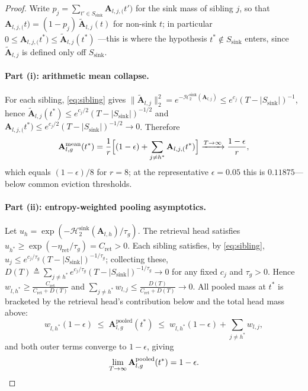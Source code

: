 \documentclass[final,5p,times,twocolumn]{elsarticle}
\theoremstyle{definition}
\theoremstyle{remark}
\newcommand{\Attn}[2]{\mathbf{A}_{#1,#2}}
\newcommand{\AttnPool}[2]{\mathbf{A}^{\mathrm{pooled}}_{#1,#2}}
\newcommand{\AttnMean}[2]{\mathbf{A}^{\mathrm{mean}}_{#1,#2}}
\newcommand{\CollisionSink}[1]{\mathcal{H}^{\mathrm{sink}}_{2}\!\left(#1\right)}
\newcommand{\Ssink}{S_{\mathrm{sink}}}
\begin{document}
\begin{proof}
Write $p_j=\sum_{t'\in\Ssink}\Attn{l,j}(t')$ for the sink mass of
sibling $j$, so that
 $\Attn{l,j}(t)=(1-p_j)\,\tilde{\mathbf{A}}_{l,j}(t)$ for non-sink $t$;
in particular $0\le\Attn{l,j}(t^{*})\le\tilde{\mathbf{A}}_{l,j}(t^{*})$%
---this is where the hypothesis $t^{*}\notin\Ssink$ enters, since
 $\tilde{\mathbf{A}}_{l,j}$ is defined only off $\Ssink$.

\paragraph{Part (i): arithmetic mean collapse.}
For each sibling, \cref{eq:sibling} gives
 $\|\tilde{\mathbf{A}}_{l,j}\|_2^2=e^{-\CollisionSink{\Attn{l}{j}}}\le
e^{c_j}(T-|\Ssink|)^{-1}$, hence
 $\tilde{\mathbf{A}}_{l,j}(t^{*})\le e^{c_j/2}(T-|\Ssink|)^{-1/2}$ and
 $\Attn{l,j}(t^{*})\le e^{c_j/2}(T-|\Ssink|)^{-1/2}\to 0$. Therefore
\begin{equation}
  \AttnMean{l}{g}(t^{*})
  = \frac{1}{r}\Bigl[(1-\epsilon)+\sum_{j\neq h^{*}}
    \Attn{l,j}(t^{*})\Bigr]
  \xrightarrow{T\to\infty} \frac{1-\epsilon}{r},
\end{equation}
which equals $(1-\epsilon)/8$ for $r=8$; at the representative
 $\epsilon=0.05$ this is $0.11875$---below common eviction thresholds.

\paragraph{Part (ii): entropy-weighted pooling asymptotics.}
Let $u_h=\exp(-\CollisionSink{\Attn{l}{h}}/\tau_g)$. The retrieval head
satisfies
 $u_{h^{*}}\ge\exp(-\eta_{\mathrm{ret}}/\tau_g)=C_{\mathrm{ret}}>0$.
Each sibling satisfies, by \cref{eq:sibling},
 $u_j\le e^{c_j/\tau_g}(T-|\Ssink|)^{-1/\tau_g}$; collecting these,
 $D(T)\triangleq\sum_{j\neq h^{*}}e^{c_j/\tau_g}(T-|\Ssink|)^{-1/\tau_g}\to 0$ for any fixed $c_j$ and $\tau_g>0$. Hence
 $w_{l,h^{*}}\ge\frac{C_{\mathrm{ret}}}{C_{\mathrm{ret}}+D(T)}$ and
 $\sum_{j\neq h^{*}}w_{l,j}\le\frac{D(T)}{C_{\mathrm{ret}}+D(T)}\to 0$.
All pooled mass at $t^{*}$ is bracketed by the retrieval head's
contribution below and the total head mass above:
\begin{equation}
  w_{l,h^{*}}(1-\epsilon)\;\le\;\AttnPool{l}{g}(t^{*})
  \;\le\;w_{l,h^{*}}(1-\epsilon)+\sum_{j\neq h^{*}}w_{l,j},
\end{equation}
and both outer terms converge to $1-\epsilon$, giving
\begin{equation}
  \lim_{T\to\infty}\AttnPool{l}{g}(t^{*})=1-\epsilon. \qedhere
\end{equation}
\end{proof}
\end{document}
